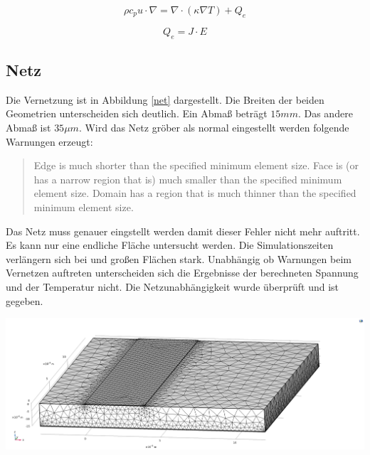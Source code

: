 \documentclass[10pt,a4paper,oneside,abstracton]{scrartcl}
\newenvironment{Figure}
  {\par\medskip\noindent\minipage{\linewidth}}
  {\endminipage\par\medskip}
\begin{document}
\begin{multicols}{2}
	\begin{equation}
		\rho c_p u \cdot \nabla = \nabla \cdot (\kappa \nabla T)+ Q_e
		\label{Super_Multi1}
		\end{equation}

		\begin{equation}
			Q_e = J \cdot E
			\label{Super_Multi2}
			\end{equation}



\subsection{Netz}
Die Vernetzung ist in Abbildung \ref*{net} dargestellt.
Die Breiten der beiden Geometrien unterscheiden sich deutlich. 
\newline
Ein Abmaß beträgt $ 15mm $. Das andere Abmaß ist $ 35 \mu m$.  
\newline
Wird das Netz gröber als normal eingestellt werden folgende Warnungen erzeugt: 
\begin{quote}
Edge is much shorter than the specified minimum element size.
\newline
Face is (or has a narrow region that is) much smaller than the specified minimum element size.
\newline
Domain has a region that is much thinner than the specified minimum element size.
\end{quote}
\noindent
Das Netz muss genauer eingstellt werden damit dieser Fehler nicht mehr auftritt. 
\newline
Es kann nur eine endliche Fläche untersucht werden.
Die Simulationszeiten verlängern sich bei und großen Flächen stark.
\newline
Unabhängig ob Warnungen beim Vernetzen auftreten unterscheiden sich die Ergebnisse der berechneten Spannung und der Temperatur nicht.
\newline
Die Netzunabhängigkeit wurde überprüft und ist gegeben. 

\begin{Figure}
	\includegraphics[width=\textwidth]{Bilder/net.png}
	\label{net}
\end{Figure}


\end{multicols}
\end{document}
